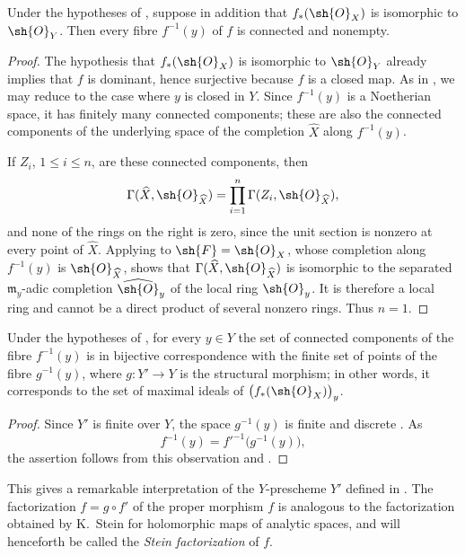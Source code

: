\begin{corollary}[4.3.2]
\label{III.4.3.2}
Under the hypotheses of , suppose in addition that
$f_*(\sh{O}_X)$ is isomorphic to $\sh{O}_Y$.  Then every fibre
$f^{-1}(y)$ of $f$ is connected and nonempty.
\end{corollary}

\begin{proof}
The hypothesis that $f_*(\sh{O}_X)$ is isomorphic to $\sh{O}_Y$
already implies that $f$ is dominant, hence surjective because $f$
is a closed map.  As in , we may reduce to the case
where $y$ is closed in $Y$.  Since $f^{-1}(y)$ is a Noetherian
space, it has finitely many connected components; these are also the
connected components of the underlying space of the completion
$\widehat{X}$ along $f^{-1}(y)$.

If $Z_i$, $1\leq i\leq n$, are these connected components, then
\[
  \Gamma(\widehat{X},\sh{O}_{\widehat{X}})
  =
  \prod_{i=1}^{n}\Gamma(Z_i,\sh{O}_{\widehat{X}}),
\]
and none of the rings on the right is zero, since the unit section is
nonzero at every point of $\widehat{X}$.  Applying
 to $\sh{F}=\sh{O}_X$, whose completion along
$f^{-1}(y)$ is $\sh{O}_{\widehat{X}}$, shows that
$\Gamma(\widehat{X},\sh{O}_{\widehat{X}})$ is isomorphic to the
separated $\mathfrak{m}_y$-adic completion
$\widehat{\sh{O}}_y$ of the local ring $\sh{O}_y$.  It is therefore
a local ring and cannot be a direct product of several nonzero rings.
Thus $n=1$.
\end{proof}

\begin{corollary}[4.3.3]
\label{III.4.3.3}
Under the hypotheses of , for every $y\in Y$ the set
of connected components of the fibre $f^{-1}(y)$ is in bijective
correspondence with the finite set of points of the fibre
$g^{-1}(y)$, where $g:Y'\to Y$ is the structural morphism; in other
words, it corresponds to the set of maximal ideals of
$\bigl(f_*(\sh{O}_X)\bigr)_y$.
\end{corollary}

\begin{proof}
Since $Y'$ is finite over $Y$, the space $g^{-1}(y)$ is finite and
discrete .  As
\[
  f^{-1}(y)=f'^{-1}\bigl(g^{-1}(y)\bigr),
\]
the assertion follows from this observation and
.
\end{proof}

This gives a remarkable interpretation of the $Y$-prescheme $Y'$
defined in .  The factorization
$f=g\circ f'$ of the proper morphism $f$ is analogous to the
factorization obtained by K.~Stein for holomorphic maps of analytic
spaces, and will henceforth be called the \emph{Stein factorization}
of $f$.

